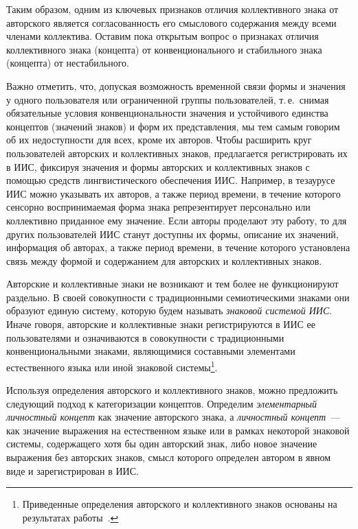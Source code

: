 \begin{multicols}{2}
   Таким образом, одним из ключевых признаков отличия коллективного знака от
авторского является согласованность его смыслового содержания между всеми членами
коллектива. Оставим пока открытым вопрос о признаках отличия коллективного знака
(концепта) от конвенционального и стабильного знака (концепта) от нестабильного.

   Важно отметить, что, допуская возможность временной связи формы и значения у одного
пользователя или ограниченной группы пользователей, т.\,е.\ снимая обязательные условия
конвенциональности значения и устойчивого единства концеп\-тов (значений знаков) и форм
их пред\-став\-ле\-ния, мы тем самым говорим об их недоступности для всех, кроме их авторов.
Чтобы расширить круг пользователей авторских и коллективных знаков, предлагается
регистрировать их в ИИС, фиксируя значения и формы авторских и коллективных знаков с
по\-мощью средств лингвистического обеспечения ИИС. Например, в тезаурусе ИИС можно
указывать их авторов, а также период времени, в течение которого сенсорно воспринимаемая
форма знака репрезентирует персонально или коллективно приданное ему значение. Если
авторы проделают эту работу, то для других пользователей ИИС станут доступны их формы,
описание их значений, информация об авторах, а также период времени, в %
течение которого
установлена связь между формой и содержанием для авторских и коллективных %
\mbox{знаков.}


   Авторские и коллективные знаки не возникают и тем более не функционируют раздельно.
В своей совокупности с традиционными семиотическими знаками они образуют единую
систему, которую будем называть \textit{знаковой системой ИИС}. Иначе говоря, авторские
и коллективные знаки регистрируются в ИИС ее пользователями и означиваются в
совокупности с традиционными конвенциональными знаками, являющимися составными
элементами естественного языка или иной знаковой сис\-те\-мы\footnote{Приведенные определения
авторского и коллективного знаков основаны на результатах работы~\cite{35za}.}.

   Используя определения авторского и коллективного знаков, можно предложить
следующий подход к категоризации концептов. Определим \textit{элементарный
личностный концепт} как значение авторского знака, а \textit{личностный концепт}~--- как
значение выражения на естественном языке или в рамках некоторой знаковой системы,
содержащего хотя бы один авторский знак, либо новое значение выражения без авторских
знаков, смысл которого определен автором в явном виде и зарегистрирован в ИИС.


\end{multicols}
